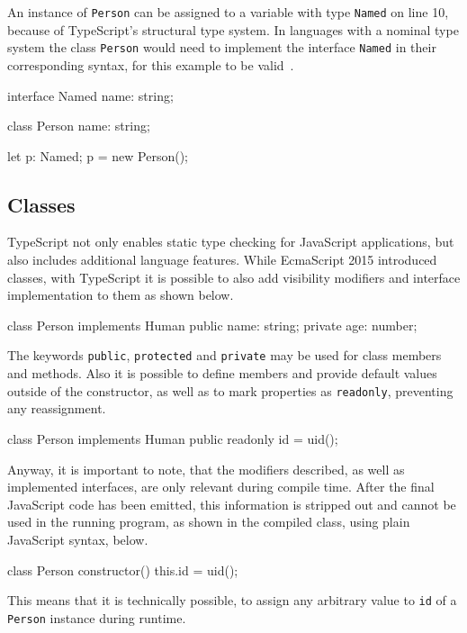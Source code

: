 \begin{program}
\caption{An instance of \texttt{Person} can be assigned to a variable with type \texttt{Named} on line 10, because of TypeScript's structural type system. In languages with a nominal type system the class \texttt{Person} would need to implement the interface \texttt{Named} in their corresponding syntax, for this example to be valid~\cite{TypeScriptHandbook:TypeCompatibility}.}
\label{prog:structural-typing}
\begin{JsCode}
interface Named {
    name: string;
}

class Person {
    name: string;
}

let p: Named;
p = new Person();
\end{JsCode}
\end{program}

\subsection{Classes}
\label{sec:ts-classes}

TypeScript not only enables static type checking for JavaScript applications, but also includes additional language features. While EcmaScript 2015 introduced classes, with TypeScript it is possible to also add visibility modifiers and interface implementation to them as shown below.
\begin{JsCode}[numbers=none]
class Person implements Human {
  public name: string;
  private age: number;
}
\end{JsCode}
The keywords \texttt{public}, \texttt{protected} and \texttt{private} may be used for class members and methods.
Also it is possible to define members and provide default values outside of the constructor, as well as to mark properties as \texttt{readonly}, preventing any reassignment.
\begin{JsCode}[numbers=none]
class Person implements Human {
  public readonly id = uid();
}
\end{JsCode}
Anyway, it is important to note, that the modifiers described, as well as implemented interfaces, are only relevant during compile time. After the final JavaScript code has been emitted, this information is stripped out and cannot be used in the running program, as shown in the compiled class, using plain JavaScript syntax, below.
\begin{JsCode}[numbers=none]
class Person {
  constructor() {
    this.id = uid();
  }
}
\end{JsCode}
This means that it is technically possible, to assign any arbitrary value to \texttt{id} of a \texttt{Person} instance during runtime.

